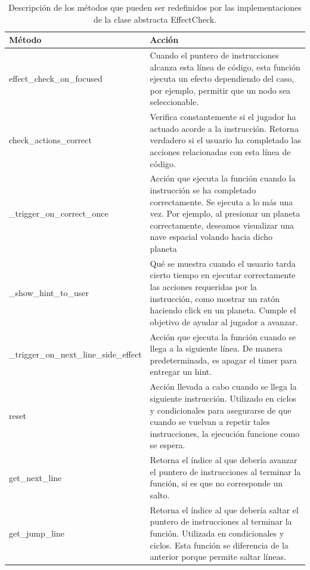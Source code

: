 \begin{table}[h]
    \centering
    \begin{tabular}{|l|p{}|}
        \hline
        \textbf{Método} & \textbf{Acción} \\
        \hline
        effect\_check\_on\_focused & Cuando el puntero de instrucciones alcanza esta línea de código, esta función ejecuta un efecto dependiendo del caso, por ejemplo, permitir que un nodo sea seleccionable.\\
        \hline
        check\_actions\_correct & Verifica constantemente si el jugador ha actuado acorde a la instrucción. Retorna verdadero si el usuario ha completado las acciones relacionadas con esta línea de código.  \\
        \hline
        \_trigger\_on\_correct\_once & Acción que ejecuta la función cuando la instrucción se ha completado correctamente. Se ejecuta a lo más una vez. Por ejemplo, al presionar un planeta correctamente, deseamos visualizar una nave espacial volando hacia dicho planeta \\
        \hline
		\_show\_hint\_to\_user & Qué se muestra cuando el usuario tarda cierto tiempo en ejecutar correctamente las acciones requeridas por la instrucción, como mostrar un ratón haciendo click en un planeta. Cumple el objetivo de ayudar al jugador a avanzar. \\
        \hline
        \_trigger\_on\_next\_line\_side\_effect & Acción que ejecuta la función cuando se llega a la siguiente línea. De manera predeterminada, es apagar el timer para entregar un hint.\\
        \hline
        reset & Acción llevada a cabo cuando se llega la siguiente instrucción. Utilizado en ciclos y condicionales para asegurarse de que cuando se vuelvan a repetir tales instrucciones, la ejecución funcione como se espera.  \\
        \hline
        get\_next\_line & Retorna el índice al que debería avanzar el puntero de instrucciones al terminar la función, si es que no corresponde un salto. \\
        \hline
        get\_jump\_line & Retorna el índice al que debería saltar el puntero de instrucciones al terminar la función. Utilizada en condicionales y ciclos. Esta función se diferencia de la anterior porque permite saltar líneas. \\
        \hline
    \end{tabular}
    \caption{Descripción de los métodos que pueden ser redefinidos por las implementaciones de la clase abstracta EffectCheck.}
    \label{table_effect_check_methods}
\end{table}


